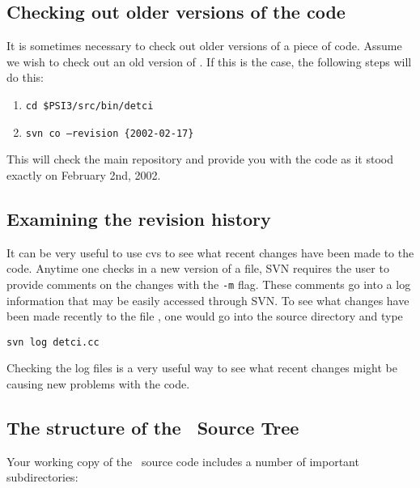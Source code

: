 \subsection{Checking out older versions of the code}
It is sometimes necessary to check out older versions of a piece of code.
Assume we wish to check out an old version of \PSIdetci. If this
is the case, the following steps will do this:
\begin{enumerate}
\item {\tt cd \$PSI3/src/bin/detci}
\item {\tt svn co --revision \{2002-02-17\}}
\end{enumerate}

This will check the main repository and provide you with the code as
it stood exactly on February 2nd, 2002. 

\subsection{Examining the revision history}
It can be very useful to use cvs to see what recent changes have been
made to the code.  Anytime one checks in a new version of a file, SVN
requires the user to provide comments on the changes with the {\tt -m}
flag.  These comments go into a log information that may be easily
accessed through SVN.  To see what changes have been made recently to
the file , one would go into the  source
directory and type
\begin{verbatim}
svn log detci.cc
\end{verbatim}
Checking the log files is a very useful way to see what recent changes might 
be causing new problems with the code.

\subsection{The structure of the \PSIthree\ Source Tree}
\label{psitree} 

Your working copy of the \PSIthree\ source code includes a number of
important subdirectories:

